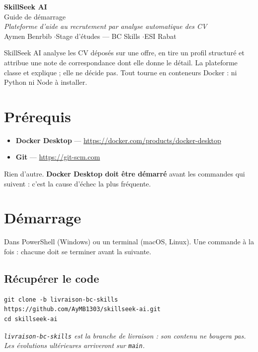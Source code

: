 \documentclass[11pt,a4paper]{article}
\begin{document}
\begin{center}
  {\Huge\bfseries\color{bleu} SkillSeek AI}\\[0.5em]
  {\Large\color{gris} Guide de démarrage}\\[1.2em]
  {\small\itshape\color{gris}
   Plateforme d'aide au recrutement par analyse automatique des CV}\\[2em]
  {\small Aymen Benrbib \quad$\cdot$\quad Stage d'études — BC Skills
   \quad$\cdot$\quad ESI Rabat}
\end{center}
\vspace{1.5em}

\noindent
SkillSeek AI analyse les CV déposés sur une offre, en tire un profil
structuré et attribue une note de correspondance dont elle donne le détail.
La plateforme classe et explique ; elle ne décide pas. Tout tourne en
conteneurs Docker : ni Python ni Node à installer.

\section{Prérequis}

\begin{itemize}
  \item \textbf{Docker Desktop} --- \url{https://docker.com/products/docker-desktop}
  \item \textbf{Git} --- \url{https://git-scm.com}
\end{itemize}

\noindent
Rien d'autre. \textbf{Docker Desktop doit être démarré} avant les commandes
qui suivent : c'est la cause d'échec la plus fréquente.

\section{Démarrage}

Dans PowerShell (Windows) ou un terminal (macOS, Linux). Une commande à la
fois : chacune doit se terminer avant la suivante.

\subsection*{Récupérer le code}
\begin{lstlisting}
git clone -b livraison-bc-skills https://github.com/AyMB1303/skillseek-ai.git
cd skillseek-ai
\end{lstlisting}
\noindent
\textcolor{gris}{\small\itshape
\texttt{livraison-bc-skills} est la branche de livraison : son contenu ne
bougera pas. Les évolutions ultérieures arriveront sur \texttt{main}.}
\end{document}
